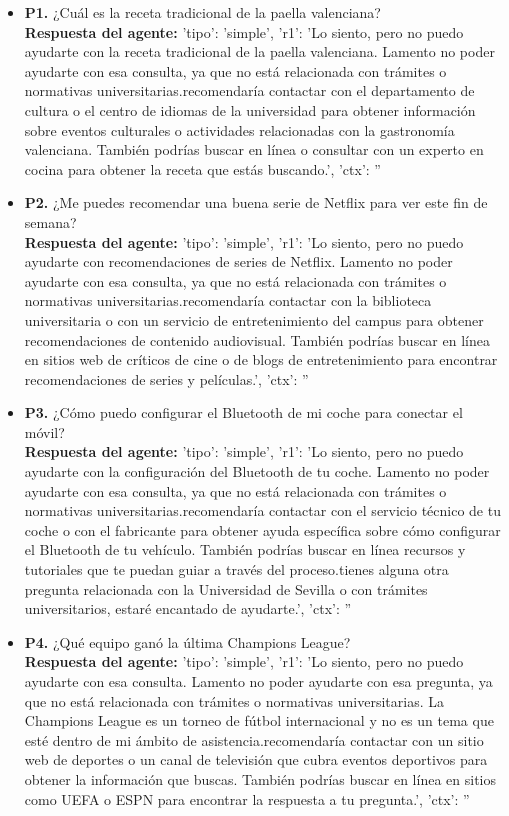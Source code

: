 \documentclass{article}
\begin{document}
\begin{itemize}
      \item \textbf{P1.} ¿Cuál es la receta tradicional de la paella valenciana? \\
            \textbf{Respuesta del agente:} {'tipo': 'simple', 'r1': 'Lo siento, pero no puedo ayudarte con la receta tradicional de la paella valenciana. Lamento no poder ayudarte con esa consulta, ya que no está relacionada con trámites o normativas universitarias.\n\nTe recomendaría contactar con el departamento de cultura o el centro de idiomas de la universidad para obtener información sobre eventos culturales o actividades relacionadas con la gastronomía valenciana. También podrías buscar en línea o consultar con un experto en cocina para obtener la receta que estás buscando.', 'ctx': ''}

      \item \textbf{P2.} ¿Me puedes recomendar una buena serie de Netflix para ver este fin de semana? \\
            \textbf{Respuesta del agente:} {'tipo': 'simple', 'r1': 'Lo siento, pero no puedo ayudarte con recomendaciones de series de Netflix. Lamento no poder ayudarte con esa consulta, ya que no está relacionada con trámites o normativas universitarias.\n\nTe recomendaría contactar con la biblioteca universitaria o con un servicio de entretenimiento del campus para obtener recomendaciones de contenido audiovisual. También podrías buscar en línea en sitios web de críticos de cine o de blogs de entretenimiento para encontrar recomendaciones de series y películas.', 'ctx': ''}

      \item \textbf{P3.} ¿Cómo puedo configurar el Bluetooth de mi coche para conectar el móvil? \\
            \textbf{Respuesta del agente:} {'tipo': 'simple', 'r1': 'Lo siento, pero no puedo ayudarte con la configuración del Bluetooth de tu coche. Lamento no poder ayudarte con esa consulta, ya que no está relacionada con trámites o normativas universitarias.\n\nTe recomendaría contactar con el servicio técnico de tu coche o con el fabricante para obtener ayuda específica sobre cómo configurar el Bluetooth de tu vehículo. También podrías buscar en línea recursos y tutoriales que te puedan guiar a través del proceso.\n\nSi tienes alguna otra pregunta relacionada con la Universidad de Sevilla o con trámites universitarios, estaré encantado de ayudarte.', 'ctx': ''}

      \item \textbf{P4.} ¿Qué equipo ganó la última Champions League? \\
            \textbf{Respuesta del agente:} {'tipo': 'simple', 'r1': 'Lo siento, pero no puedo ayudarte con esa consulta. Lamento no poder ayudarte con esa pregunta, ya que no está relacionada con trámites o normativas universitarias. La Champions League es un torneo de fútbol internacional y no es un tema que esté dentro de mi ámbito de asistencia.\n\nTe recomendaría contactar con un sitio web de deportes o un canal de televisión que cubra eventos deportivos para obtener la información que buscas. También podrías buscar en línea en sitios como UEFA o ESPN para encontrar la respuesta a tu pregunta.', 'ctx': ''}


\end{itemize}
\end{document}
